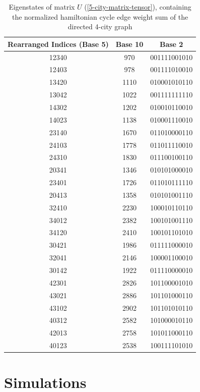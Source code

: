 \documentclass[msc,oneside]{ubcthesis}
\begin{document}
\begin{table}[h]
\centering
\begin{tabular}{|c|c|c|}	
		
		\hline
		\textbf{Rearranged Indices (Base 5)} & \textbf{Base 10} & \textbf{Base 2} \\
		\hline
		12340 & 970 & 001111001010 \\
		12403 & 978 & 001111010010 \\
		13420 & 1110 & 010001010110 \\
		13042 & 1022 & 001111111110 \\
		14302 & 1202 & 010010110010 \\
		14023 & 1138 & 010001110010 \\
		23140 & 1670 & 011010000110 \\
		24103 & 1778 & 011011110010 \\
		24310 & 1830 & 011100100110 \\
		20341 & 1346 & 010101000010 \\
		23401 & 1726 & 011010111110 \\
		20413 & 1358 & 010101001110 \\
		32410 & 2230 & 100010110110 \\
		34012 & 2382 & 100101001110 \\
		34120 & 2410 & 100101101010 \\
		30421 & 1986 & 011111000010 \\
		32041 & 2146 & 100001100010 \\
		30142 & 1922 & 011110000010 \\
		42301 & 2826 & 101100001010 \\
		43021 & 2886 & 101101000110 \\
		43102 & 2902 & 101101010110 \\
		40312 & 2582 & 101000010110 \\
		42013 & 2758 & 101011000110 \\
		40123 & 2538 & 100111101010 \\
		\hline
		\end{tabular}
		\caption{Eigenstates of matrix $U$ (\ref{5-city-matrix-tensor}), containing the normalized hamiltonian cycle edge weight sum of the directed 4-city graph}
		\label{table:5-city-conversions}
	\end{table}
	
	


	
	\chapter{Simulations}
	
\end{document}
